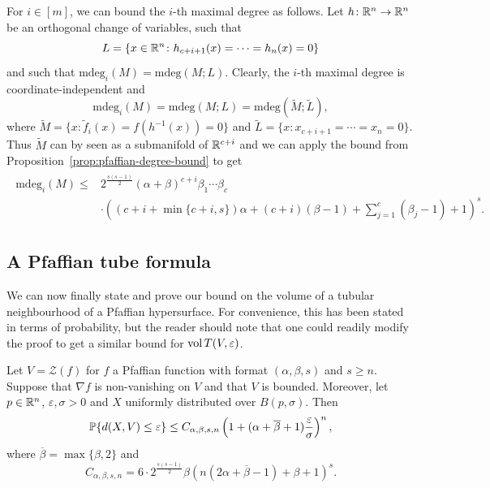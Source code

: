 For $i\in [m]$, we can bound the $i$-th maximal degree as follows. Let $h\colon \mathbb{R}^n\to \mathbb{R}^n$ be an orthogonal change of variables, such that
\begin{equation*}
 L = \{x\in \mathbb{R}^n \colon h_{c+i+1}(x)=\cdots =h_{n}(x)=0\} 
\end{equation*}
and such that $\mathrm{mdeg}_i(M) = \mathrm{mdeg}(M;L)$. Clearly, the $i$-th maximal degree is coordinate-independent and
\begin{equation*}
  \mathrm{mdeg}_i(M) = \mathrm{mdeg}(M;L) = \mathrm{mdeg}(\tilde{M};\tilde{L}),
\end{equation*}
where $\tilde{M}=\{x\colon \tilde{f}_i(x)=f(h^{-1}(x))=0\}$ and $\tilde{L} = \{x\colon x_{c+i+1}=\cdots =x_{n}=0\}$. 
Thus $\tilde{M}$ can by seen as a submanifold of $\mathbb{R}^{c+i}$ and we can apply the bound from Proposition~\ref{prop:pfaffian-degree-bound} to get
\begin{align} 
  \begin{split}
  \label{eq:ideg}
  \mathrm{mdeg}_i(M) \leq &2^{\frac{s(s-1)}{2}}(\alpha+\beta)^{c+i}\beta_1\cdots \beta_c\\
  &\cdot\left((c+i+\min\{c+i,s\})\alpha+(c+i)(\beta-1)+\sum_{j=1}^c(\beta_j-1)+1\right)^s.
  \end{split}
\end{align}


\subsection{A Pfaffian tube formula}
We can now finally state and prove our bound on the volume of a tubular neighbourhood of a Pfaffian hypersurface. For convenience, this has been stated in terms of probability, 
but the reader should note that one could readily modify the proof to get a similar bound for $\operatorname{vol} T(V, \varepsilon)$. 

\begin{theorem} \label{thm:prob_bound}
Let $V = \mathcal{Z}(f)$ for $f$ a Pfaffian function with format $(\alpha, \beta, s)$ and $s\geq n$. Suppose that $\nabla f$ is non-vanishing on $V$ and that $V$ is bounded. Moreover, let $p \in \mathbb{R}^n$, $\varepsilon, \sigma > 0$ and $X$ uniformly distributed over $B(p, \sigma)$. Then
\begin{equation*}
\operatorname*{\mathbb{P}}\{ d(X, V) \le \varepsilon \} \leq C_{\alpha,\beta,s,n}\left(1+(\alpha+\overline{\beta}+1)\frac{\varepsilon}{\sigma}\right)^n,
\end{equation*}
where $\overline{\beta}= \max\{\beta,2\}$ and
\begin{equation*}
C_{\alpha,\beta,s,n} =  6\cdot 2^{\frac{s(s-1)}{2}}\beta\left(n(2\alpha+\overline{\beta}-1)+\beta+1\right)^s.
\end{equation*}
\end{theorem}

